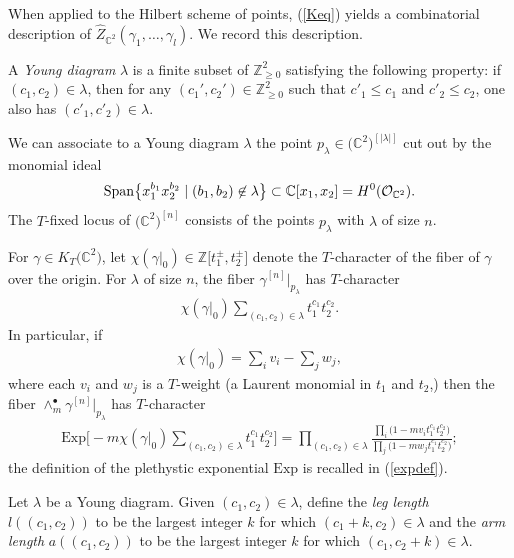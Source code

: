 \documentclass[pdftex]{sigma}
\numberwithin{equation}{section}
\newcommand{\Exp}{\mathrm{Exp}}
\def\C{\mathbb C}
\def\Z{\mathbb Z}
\begin{document}
When applied to the Hilbert scheme of points, (\ref{Keq}) yields a combinatorial description of $\hat{Z}_{\C^2}(\gamma_1,\dots,\gamma_l).$ We record this description.

A {\em Young diagram} $\lambda$ is a finite subset of $\Z^2_{\geq 0}$ satisfying the following property: if $(c_1,c_2)\in \lambda$, then for any $(c_1',c_2')\in\Z^2_{\geq 0}$ such that $c'_1\leq c_1$ and $c'_2\leq c_2$, one also has $(c'_1,c'_2)\in \lambda$.

We can associate to a Young diagram $\lambda$ the point $p_{\lambda}\in \big(\C^2\big)^{[|\lambda|]}$ cut out by the monomial ideal
\begin{gather*}
\mathop{\rm Span}\bigl\{ x_1^{b_1}x_2^{b_2}\mid (b_1,b_2)\not\in \lambda\bigr\} \subset \C[x_1,x_2]=H^0(\mathcal{O}_{\C^2}).
\end{gather*}
The $T$-fixed locus of $\big(\C^2\big)^{[n]}$ consists of the points $p_{\lambda}$ with $\lambda$ of size $n$.

For $\gamma\in K_T\big(\C^2\big)$, let $\chi(\gamma|_{0})\in \Z\big[t_1^{\pm},t_2^{\pm}\big]$ denote the $T$-character of the fiber of $\gamma$ over the origin. For $\lambda$ of size $n$, the fiber $\gamma^{[n]}|_{p_{\lambda}}$ has $T$-character
\begin{gather*}
\chi(\gamma|_{0}) \sum_{(c_1,c_2)\in \lambda}t_1^{c_1}t_2^{c_2}.
\end{gather*}
In particular, if
\begin{gather*}
\chi(\gamma|_{0})=\sum_{i} v_i -\sum_{j} w_j,
\end{gather*}
where each $v_i$ and $w_j$ is a $T$-weight (a Laurent monomial in $t_1$ and $t_2$,) then the fiber $ \wedge^{\bullet}_m \gamma^{[n]}|_{p_{\lambda}}$ has $T$-character
\begin{gather*}
\Exp\biggl[{-}m\chi(\gamma|_{0}) \sum_{(c_1,c_2)\in\lambda}t_1^{c_1}t_2^{c_2}\biggr]=\prod_{(c_1,c_2)\in \lambda} \frac{\prod_{i}\big(1-mv_it_1^{c_1}t_2^{c_2}\big)}{\prod_{j}\big(1-mw_jt_1^{c_1}t_2^{c_2}\big)};
\end{gather*}
the definition of the plethystic exponential $\Exp$ is recalled in (\ref{expdef}).

Let $\lambda$ be a Young diagram. Given $(c_1,c_2)\in \lambda$, define the {\em leg length} $l((c_1,c_2))$ to be the largest integer $k$ for which $(c_1+k,c_2)\in \lambda$ and the {\em arm length} $a((c_1,c_2))$ to be the largest integer $k$ for which $(c_1,c_2+k)\in \lambda$.
\end{document}
